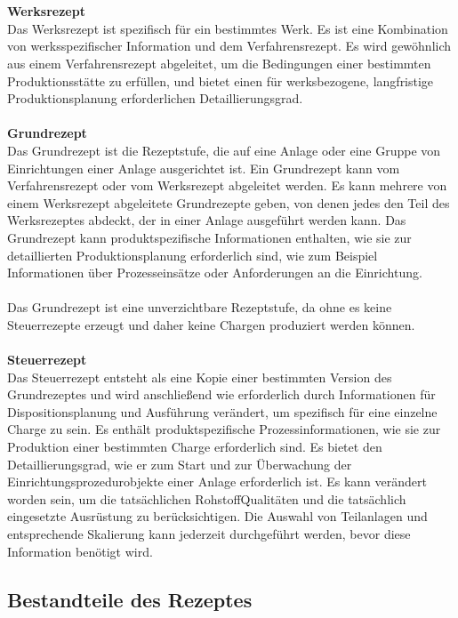 \\\\
\textbf{Werksrezept}\\
Das Werksrezept ist spezifisch für ein bestimmtes Werk. Es ist eine Kombination von werksspezifischer Information und dem Verfahrensrezept. Es wird gewöhnlich aus einem Verfahrensrezept abgeleitet, um die Bedingungen einer bestimmten Produktionsstätte zu erfüllen, und bietet einen für werksbezogene, langfristige Produktionsplanung erforderlichen Detaillierungsgrad.
\\\\
\textbf{Grundrezept}\\
Das Grundrezept ist die Rezeptstufe, die auf eine Anlage oder eine Gruppe von Einrichtungen einer Anlage ausgerichtet ist. Ein Grundrezept kann vom Verfahrensrezept oder vom Werksrezept abgeleitet werden. Es kann mehrere von einem Werksrezept abgeleitete Grundrezepte geben, von denen jedes den Teil des Werksrezeptes abdeckt, der in einer Anlage ausgeführt werden kann. Das Grundrezept kann produktspezifische Informationen enthalten, wie sie zur detaillierten Produktionsplanung erforderlich sind, wie zum Beispiel Informationen über Prozesseinsätze oder Anforderungen an die Einrichtung.\\\\
Das Grundrezept ist eine unverzichtbare Rezeptstufe, da ohne es keine Steuerrezepte erzeugt und daher keine Chargen produziert werden können.
\\\\
\textbf{Steuerrezept}\\
Das Steuerrezept entsteht als eine Kopie einer bestimmten Version des Grundrezeptes und wird anschließend wie erforderlich durch Informationen für Dispositionsplanung und Ausführung verändert, um spezifisch für eine einzelne Charge zu sein. Es enthält produktspezifische Prozessinformationen, wie sie zur Produktion einer bestimmten Charge erforderlich sind. Es bietet den Detaillierungsgrad, wie er zum Start und zur Überwachung der Einrichtungsprozedurobjekte einer Anlage erforderlich ist. Es kann verändert worden sein, um die tatsächlichen RohstoffQualitäten und die tatsächlich eingesetzte Ausrüstung zu berücksichtigen. Die Auswahl von Teilanlagen und entsprechende Skalierung kann jederzeit durchgeführt werden, bevor diese Information benötigt wird.\\
\cite{en61512}

\subsection{Bestandteile des Rezeptes}

